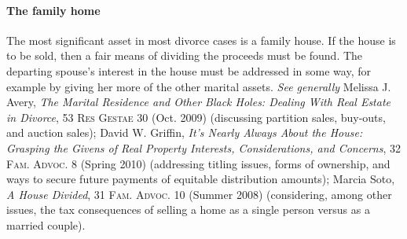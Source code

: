 \paragraph{The family home} The most significant asset in most divorce cases is
a family house. If the house is to be sold, then a fair means of dividing the
proceeds must be found. The departing spouse's interest in the house must be
addressed in some way, for example by giving her more of the other marital
assets. \textit{See generally} Melissa J. Avery, \emph{The Marital Residence and
Other Black Holes: Dealing With Real Estate in Divorce}, 53 \textsc{Res Gestae}
30 (Oct. 2009) (discussing partition sales, buy-outs, and auction sales); David
W. Griffin, \emph{It's Nearly Always About the House: Grasping the Givens of
Real Property Interests, Considerations, and Concerns}, 32 \textsc{Fam. Advoc.}
8 (Spring 2010) (addressing titling issues, forms of ownership, and ways to
secure future payments of equitable distribution amounts); Marcia Soto, \emph{A
House Divided}, 31
\textsc{Fam. Advoc.} 10 (Summer 2008) (considering, among other issues, the tax
consequences of selling a home as a single person versus as a married couple).


